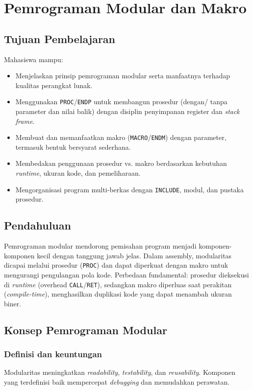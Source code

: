 \chapter{Pemrograman Modular dan Makro}

\section{Tujuan Pembelajaran}
Mahasiswa mampu:
\begin{itemize}
    \item Menjelaskan prinsip pemrograman modular serta manfaatnya terhadap kualitas perangkat lunak.
    \item Menggunakan \texttt{PROC}/\texttt{ENDP} untuk membangun prosedur (dengan/ tanpa parameter dan nilai balik) dengan disiplin penyimpanan register dan \textit{stack frame}.
    \item Membuat dan memanfaatkan makro (\texttt{MACRO}/\texttt{ENDM}) dengan parameter, termasuk bentuk bersyarat sederhana.
    \item Membedakan penggunaan prosedur vs. makro berdasarkan kebutuhan \textit{runtime}, ukuran kode, dan pemeliharaan.
    \item Mengorganisasi program multi-berkas dengan \texttt{INCLUDE}, modul, dan pustaka prosedur.
\end{itemize}

\section{Pendahuluan}
Pemrograman modular mendorong pemisahan program menjadi komponen-komponen kecil dengan tanggung jawab jelas. Dalam assembly, modularitas dicapai melalui prosedur (\texttt{PROC}) dan dapat diperkuat dengan makro untuk mengurangi pengulangan pola kode. Perbedaan fundamental: prosedur dieksekusi di \textit{runtime} (overhead \texttt{CALL}/\texttt{RET}), sedangkan makro diperluas saat perakitan (\textit{compile-time}), menghasilkan duplikasi kode yang dapat menambah ukuran biner.

\section{Konsep Pemrograman Modular}
\subsection{Definisi dan keuntungan}
Modularitas meningkatkan \textit{readability}, \textit{testability}, dan \textit{reusability}. Komponen yang terdefinisi baik mempercepat \textit{debugging} dan memudahkan perawatan.

